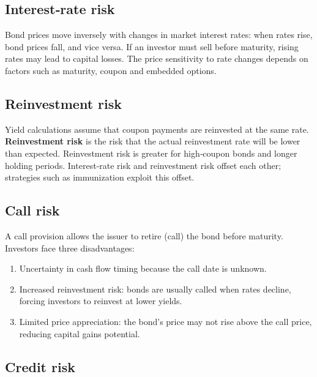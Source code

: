 \documentclass[
  letterpaper,
  DIV=11,
  numbers=noendperiod]{scrartcl}
\providecommand{\tightlist}{%
  \setlength{\itemsep}{0pt}\setlength{\parskip}{0pt}}
\begin{document}
\subsection{Interest‑rate risk}\label{interestrate-risk}

Bond prices move inversely with changes in market interest rates: when
rates rise, bond prices fall, and vice versa. If an investor must sell
before maturity, rising rates may lead to capital losses. The price
sensitivity to rate changes depends on factors such as maturity, coupon
and embedded options.

\subsection{Reinvestment risk}\label{reinvestment-risk}

Yield calculations assume that coupon payments are reinvested at the
same rate. \textbf{Reinvestment risk} is the risk that the actual
reinvestment rate will be lower than expected. Reinvestment risk is
greater for high‑coupon bonds and longer holding periods. Interest‑rate
risk and reinvestment risk offset each other; strategies such as
immunization exploit this offset.

\subsection{Call risk}\label{call-risk}

A call provision allows the issuer to retire (call) the bond before
maturity. Investors face three disadvantages:

\begin{enumerate}
\def\labelenumi{\arabic{enumi}.}
\tightlist
\item
  Uncertainty in cash flow timing because the call date is unknown.\\
\item
  Increased reinvestment risk: bonds are usually called when rates
  decline, forcing investors to reinvest at lower yields.\\
\item
  Limited price appreciation: the bond's price may not rise above the
  call price, reducing capital gains potential.
\end{enumerate}

\subsection{Credit risk}\label{credit-risk}
\end{document}
